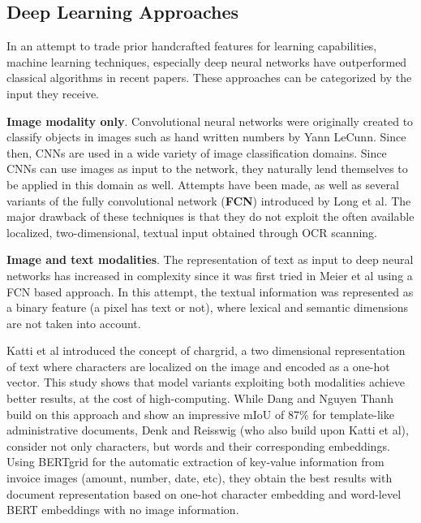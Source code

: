 \documentclass[english, bibtex]{kththesis}
\begin{document}
\subsection{Deep Learning Approaches}

In an attempt to trade prior handcrafted features for learning capabilities, machine learning techniques, especially deep neural networks have outperformed classical algorithms in recent papers. These approaches can be categorized by the input they receive.

\textbf{Image modality only}. Convolutional neural networks were originally created to classify objects in images such as hand written numbers by Yann LeCunn\cite{lecun1989}. Since then, CNNs are used in a wide variety of image classification domains\cite{deng2009}. Since CNNs can use images as input to the network, they naturally lend themselves to be applied in this domain as well. Attempts have been made\cite{DBLP:journals/corr/0011S17}, as well as several variants\cite{he2017}\cite{xu2017}\cite{wickpuppe2018}\cite{oliveira2018} of the fully convolutional network (\textbf{FCN}) introduced by Long et al\cite{DBLP:journals/corr/LongSD14}. The major drawback of these techniques is that they do not exploit the often available localized, two-dimensional, textual input obtained through OCR scanning.  

\textbf{Image and text modalities}. The representation of text as input to deep neural networks has increased in complexity since it was first tried in Meier et al\cite{8270006} using a FCN based approach. In this attempt, the textual information was represented as a binary feature (a pixel has text or not), where lexical and semantic dimensions are not taken into account. 

Katti et al\cite{katti2018} introduced the concept of chargrid, a two dimensional representation of text where characters are localized on the image and encoded as a one-hot vector. This study shows that model variants exploiting both modalities achieve better results, at the cost of high-computing. While Dang and Nguyen Thanh\cite{DBLP:journals/corr/abs-2106-00952} build on this approach and show an impressive mIoU of 87\% for template-like administrative documents, Denk and Reisswig\cite{DBLP:journals/corr/abs-1909-04948} (who also build upon Katti et al\cite{katti2018}), consider not only characters, but words and their corresponding embeddings. Using BERTgrid for the automatic extraction of key-value information from invoice images (amount, number, date, etc), they obtain the best results with document representation based on one-hot character embedding and word-level BERT embeddings with no image information.
\end{document}
